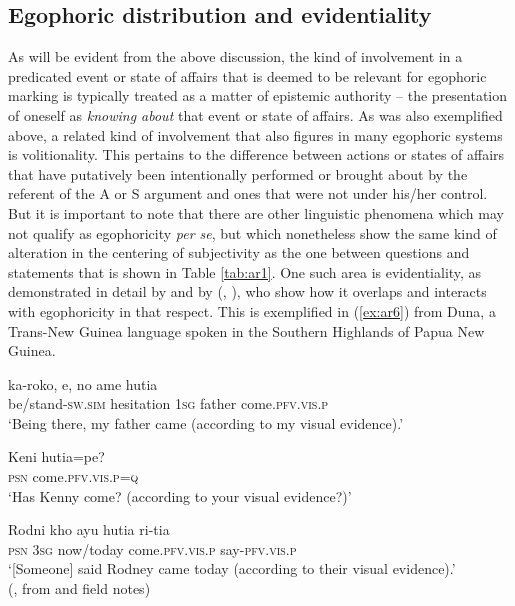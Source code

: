 \documentclass[output=paper]{langsci/langscibook}
\begin{document}
\subsection{Egophoric distribution and evidentiality}\label{s:ar2-1}

As will be evident from the above discussion, the kind of involvement in a predicated event or state of affairs that is deemed to be relevant for egophoric marking is typically treated as a matter of epistemic authority – the presentation of oneself as \textit{knowing about} that event or state of affairs. As was also exemplified above, a related kind of involvement that also figures in many egophoric systems is volitionality. This pertains to the difference between actions or states of affairs that have putatively been intentionally performed or brought about by the referent of the A or S argument and ones that were not under his/her control. But it is important to note that there are other linguistic phenomena which may not qualify as egophoricity \textit{per se}, but which nonetheless show the same kind of alteration in the centering of subjectivity as the one between questions and statements that is shown in Table \ref{tab:ar1}. One such area is evidentiality, as demonstrated in detail by \cite{Aikhenvald2004} and by \citeauthor{SanRoque2015} (\citealt{SanRoque2015}, \citealt{SanRoqueSchieffelin2018}), who show how it overlaps and interacts with egophoricity in that respect.  This is exemplified in (\ref{ex:ar6}) from Duna, a Trans-New Guinea language spoken in the Southern Highlands of Papua New Guinea.

\begin{exe}
	\ex \label{ex:ar6}
	\begin{xlist}
		\ex \label{ex:ar6a}
		\gll ka-roko, e, no ame hutia\\
		be/stand-\textsc{sw}.\textsc{sim} hesitation 1\textsc{sg} father come.\textsc{pfv}.\textsc{vis}.\textsc{p}\\
		\trans ‘Being there, my father came (according to my visual evidence).’

		\ex \label{ex:ar6b}
		\gll Keni hutia=pe?\\
		\textsc{psn} come.\textsc{pfv}.\textsc{vis}.\textsc{p}=\textsc{q}\\
		\trans ‘Has Kenny come? (according to your visual evidence?)’
		
		\ex \label{ex:ar6c}
		\gll Rodni kho ayu hutia ri-tia\\
		\textsc{psn} 3\textsc{sg} now/today come.\textsc{pfv}.\textsc{vis}.\textsc{p} say-\textsc{pfv}.\textsc{vis}.\textsc{p}\\
		\trans ‘[Someone] said Rodney came today (according to their visual evidence).’ \\(\citealt[56]{SanRoqueSchieffelin2018}, from \citealt{SanRoque2008} and field notes)
	\end{xlist}	
\end{exe}
\end{document}
